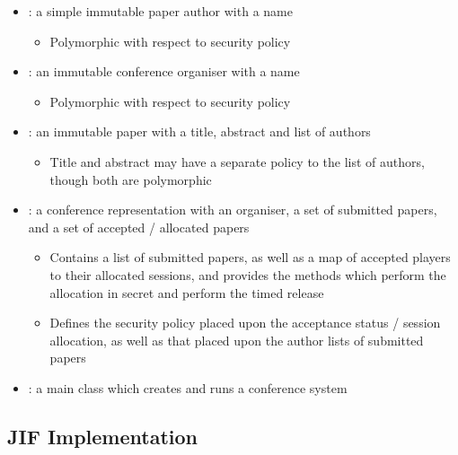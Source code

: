 \begin{itemize}
	
	\item {}: a simple immutable paper author with a name
	
	\begin{itemize}
		\item Polymorphic with respect to security policy
	\end{itemize}
	
	\item {}: an immutable conference organiser with a name
	
	\begin{itemize}
		\item Polymorphic with respect to security policy
	\end{itemize}
	
	\item {}: an immutable paper with a title, abstract and list of authors
	
	\begin{itemize}
		\item Title and abstract may have a separate policy to the list of authors, though both are polymorphic
	\end{itemize}
	
	\item {}: a conference representation with an organiser, a set of submitted papers, and a set of accepted / allocated papers
	
	\begin{itemize}
		\item Contains a list of submitted papers, as well as a map of accepted players to their allocated sessions, and provides the methods which perform the allocation in secret and perform the timed release
		
		\item Defines the security policy placed upon the acceptance status / session allocation, as well as that placed upon the author lists of submitted papers
	\end{itemize}
	
	\item {}: a main class which creates and runs a conference system
	 
\end{itemize}

\newpage

\subsection{JIF Implementation} \label{cs_conf_jif_impl}

